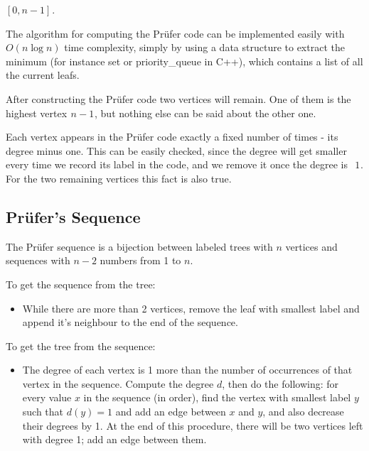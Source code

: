 $[0, n-1]$ .

The algorithm for computing the Prüfer code can be implemented easily with  
$O(n \log n)$ time complexity, simply by using a data structure to extract the minimum (for instance set or priority\_queue in C++), which contains a list of all the current leafs.

After constructing the Prüfer code two vertices will remain. One of them is the highest vertex  $n-1$ , but nothing else can be said about the other one.

Each vertex appears in the Prüfer code exactly a fixed number of times - its degree minus one. This can be easily checked, since the degree will get smaller every time we record its label in the code, and we remove it once the degree is  
$1$ . For the two remaining vertices this fact is also true.

\subsection{Prüfer's Sequence}
The Prüfer sequence is a bijection between labeled trees with $n$ vertices and sequences with $n-2$ numbers from 1 to $n$.

To get the sequence from the tree:

\begin{itemize}
    \item While there are more than 2 vertices, remove the leaf with smallest label and append it's neighbour to the end of the sequence.
\end{itemize}

To get the tree from the sequence:

\begin{itemize}
    \item The degree of each vertex is 1 more than the number of occurrences of that vertex in the sequence. Compute the degree $d$, then do the following: for every value $x$ in the sequence (in order), find the vertex with smallest label $y$ such that $d(y) = 1$ and add an edge between $x$ and $y$, and also decrease their degrees by 1. At the end of this procedure, there will be two vertices left with degree 1; add an edge between them.
\end{itemize}






